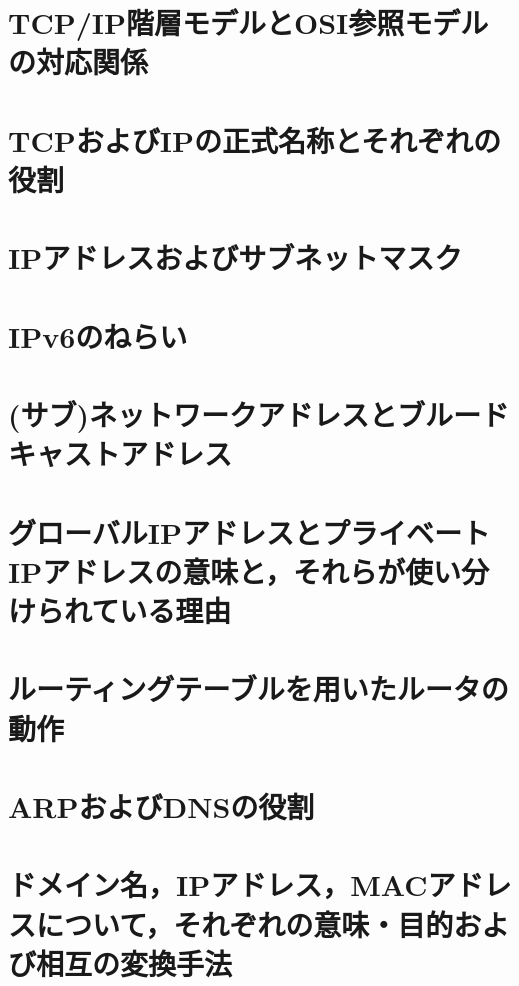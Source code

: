 \documentclass[10.5pt]{jsarticle}
\begin{document}
\section{TCP/IP階層モデルとOSI参照モデルの対応関係}



\section{TCPおよびIPの正式名称とそれぞれの役割}



\section{IPアドレスおよびサブネットマスク}



\section{IPv6のねらい}



\section{(サブ)ネットワークアドレスとブルードキャストアドレス}



\section{グローバルIPアドレスとプライベートIPアドレスの意味と，それらが使い分けられている理由}



\section{ルーティングテーブルを用いたルータの動作}



\section{ARPおよびDNSの役割}



\section{ドメイン名，IPアドレス，MACアドレスについて，それぞれの意味・目的および相互の変換手法}
\end{document}
